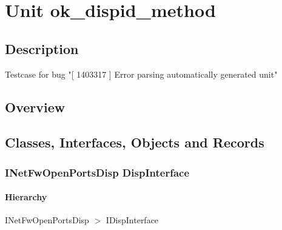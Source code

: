 \documentclass{report}
\newif\ifpdf
\begin{document}
\label{toc}\tableofcontents
\newpage
\newlength{\tmplength}
\chapter{Unit ok{\_}dispid{\_}method}
\label{ok_dispid_method}
\section{Description}
Testcase for bug "[ 1403317 ] Error parsing automatically generated unit"
\section{Overview}
\begin{description}
\item[\texttt{\begin{ttfamily}INetFwOpenPortsDisp\end{ttfamily} DispInterface}]
\end{description}
\section{Classes, Interfaces, Objects and Records}
\ifpdf
\subsection*{\large{\textbf{INetFwOpenPortsDisp DispInterface}}\normalsize\hspace{1ex}\hrulefill}
\else
\subsection*{INetFwOpenPortsDisp DispInterface}
\fi
\label{ok_dispid_method.INetFwOpenPortsDisp}
\subsubsection*{\large{\textbf{Hierarchy}}\normalsize\hspace{1ex}\hfill}
INetFwOpenPortsDisp {$>$} IDispInterface
\end{document}

